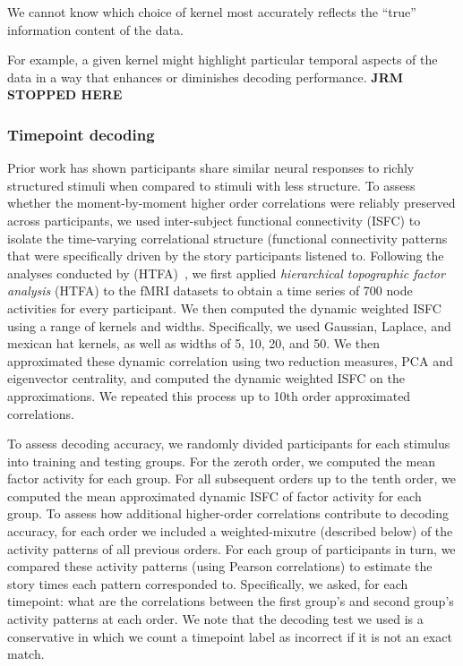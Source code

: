 We cannot know which choice of kernel most accurately
reflects the ``true'' information content of the data.

For example, a
given kernel might highlight particular temporal aspects of the data
in a way that enhances or diminishes decoding performance.
\textbf{JRM STOPPED HERE}


\subsubsection*{Timepoint decoding}

Prior work has shown participants share similar neural responses to
richly structured stimuli when compared to stimuli with less
structure.  To assess whether the moment-by-moment higher order
correlations were reliably preserved across participants, we used
inter-subject functional connectivity (ISFC) to isolate the
time-varying correlational structure (functional connectivity patterns
that were specifically driven by the story participants listened to.
Following the analyses conducted by (HTFA)~\cite{MannEtal18}, we first
applied \textit{hierarchical topographic factor analysis} (HTFA) to
the fMRI datasets to obtain a time series of 700 node activities for
every participant.  We then computed the dynamic weighted ISFC using a
range of kernels and widths.  Specifically, we used Gaussian, Laplace,
and mexican hat kernels, as well as widths of 5, 10, 20, and 50.  We
then approximated these dynamic correlation using two reduction measures, PCA and eigenvector centrality, and computed the dynamic weighted ISFC on the approximations.  We repeated this process up to 10th order approximated correlations.  

To assess decoding accuracy, we randomly divided participants for each
stimulus into training and testing groups. For the zeroth order, we
computed the mean factor activity for each group.  For all subsequent
orders up to the tenth order, we computed the mean approximated
dynamic ISFC of factor activity for each group. To assess how
additional higher-order correlations contribute to decoding accuracy,
for each order we included a weighted-mixutre (described below) of the activity patterns of all
previous orders.  For each group of participants in turn, we compared these activity patterns (using Pearson correlations) to estimate the story times each pattern corresponded to. Specifically, we asked, for each timepoint: what are the correlations
between the first group's and second group's activity patterns at each
order. We note that the decoding test we used is a conservative in which we count a timepoint label as incorrect if it is not an exact match.

